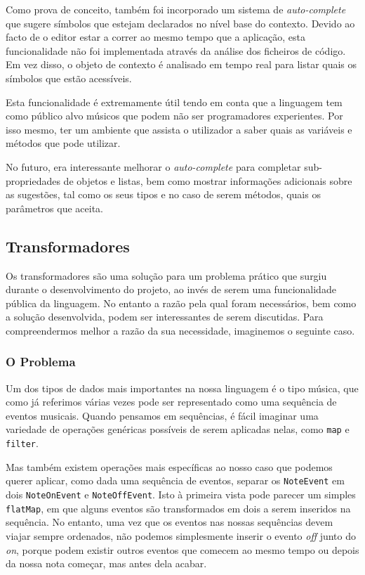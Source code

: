 Como prova de conceito, também foi incorporado um sistema de \textit{auto-complete} que sugere símbolos que estejam declarados no nível base do contexto. Devido ao facto de o editor estar a correr ao mesmo tempo que a aplicação, esta funcionalidade não foi implementada através da análise dos ficheiros de código. Em vez disso, o objeto de contexto é analisado em tempo real para listar quais os símbolos que estão acessíveis.

Esta funcionalidade é extremamente útil tendo em conta que a linguagem tem como público alvo músicos que podem não ser programadores experientes. Por isso mesmo, ter um ambiente que assista o utilizador a saber quais as variáveis e métodos que pode utilizar.

No futuro, era interessante melhorar o \textit{auto-complete} para completar sub-propriedades de objetos e listas, bem como mostrar informações adicionais sobre as sugestões, tal como os seus tipos e no caso de serem métodos, quais os parâmetros que aceita.

\subsection{Transformadores}
Os transformadores são uma solução para um problema prático que surgiu durante o desenvolvimento do projeto, ao invés de serem uma funcionalidade pública da linguagem. No entanto a razão pela qual foram necessários, bem como a solução desenvolvida, podem ser interessantes de serem discutidas. Para compreendermos melhor a razão da sua necessidade, imaginemos o seguinte caso.

\subsubsection{O Problema}

Um dos tipos de dados mais importantes na nossa linguagem é o tipo música, que como já referimos várias vezes pode ser representado como uma sequência de eventos musicais. Quando pensamos em sequências, é fácil imaginar uma variedade de operações genéricas possíveis de serem aplicadas nelas, como \texttt{map} e \texttt{filter}. 

Mas também existem operações mais específicas ao nosso caso que podemos querer aplicar, como dada uma sequência de eventos, separar os \texttt{NoteEvent} em dois \texttt{NoteOnEvent} e \texttt{NoteOffEvent}. Isto à primeira vista pode parecer um simples \texttt{flatMap}, em que alguns eventos são transformados em dois a serem inseridos na sequência. No entanto, uma vez que os eventos nas nossas sequências devem viajar sempre ordenados, não podemos simplesmente inserir o evento \textit{off} junto do \textit{on}, porque podem existir outros eventos que comecem ao mesmo tempo ou depois da nossa nota começar, mas antes dela acabar.

